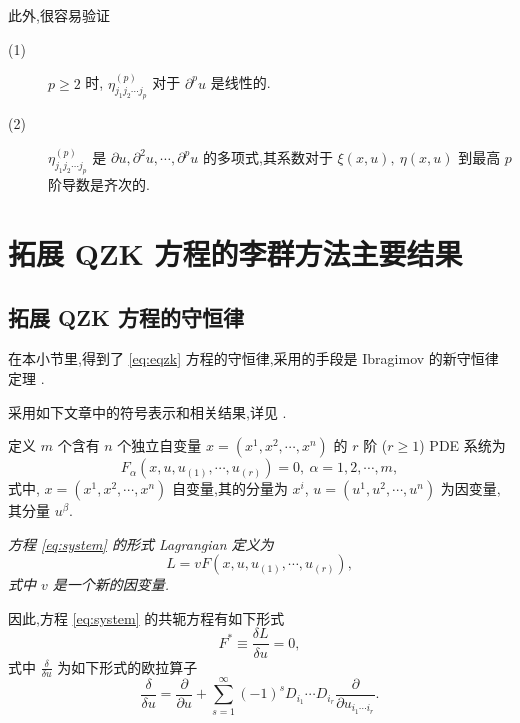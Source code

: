 此外,很容易验证
\begin{description}
	\item[(1)] $p\geq 2$ 时, $\eta_{j_1j_2\cdots j_p}^{(p)}$ 对于 $\partial^pu$ 是线性的.
	\item[(2)] $\eta_{j_1j_2\cdots j_p}^{(p)}$ 是 $\partial u,\partial^2u,\cdots,\partial^pu$ 的多项式,其系数对于 $\xi(x,u),~\eta(x,u)$ 到最高 $p$ 阶导数是齐次的.
\end{description}

\section{拓展 QZK 方程的李群方法主要结果}

\subsection{拓展 QZK 方程的守恒律}\label{sec:05con}
在本小节里,得到了 \eqref{eq:eqzk} 方程的守恒律,采用的手段是 Ibragimov 的新守恒律定理 \cite{wazwaz2012soli,yan2009per}.

采用如下文章中的符号表示和相关结果,详见 \cite{wazwaz2012soli,yan2009per,yasar2010con,zakharov1974on}.

定义 $m$ 个含有 $n$ 个独立自变量 $x=(x^1,x^2,\cdots,x^n)$ 的 $r$ 阶  ($r\geq1$) PDE 系统为
\begin{equation}\label{eq:system}
F_\alpha(x,u,u_{(1)},\cdots,u_{(r)})=0,~ \alpha=1,2,\cdots,m,
\end{equation}
式中, $x=(x^1,x^2,\cdots,x^n)$ 自变量,其的分量为 $x^i$, $u=(u^1,u^2,\cdots,u^n)$ 为因变量,其分量 $u^\beta$.

\begin{definition}[形式 Lagrangian]
	\emph{方程 \eqref{eq:system} 的形式 Lagrangian 定义为
	\begin{equation*}
		L=vF(x,u,u_{(1)},\cdots,u_{(r)}),
	\end{equation*}
	式中 $v$ 是一个新的因变量.}
\end{definition}

因此,方程 \eqref{eq:system} 的共轭方程有如下形式
\begin{equation}\label{eq:adjoint}
	F^*\equiv \frac{\delta L}{\delta u} = 0,
\end{equation}
式中 $\displaystyle \frac{\delta}{\delta u}$ 为如下形式的欧拉算子
\begin{equation*}
	\frac{\delta}{\delta u} = \frac{\partial}{\partial u}+\sum_{s=1}^{\infty}(-1)^{s}D_{i_1}\cdots D_{i_r}\frac{\partial}{\partial u_{i_1\cdots i_r}}.
\end{equation*}

